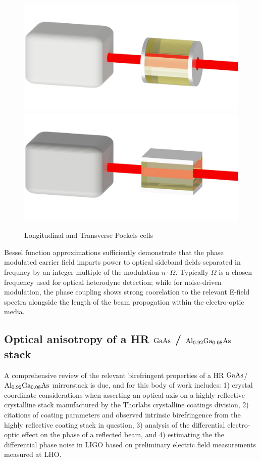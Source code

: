 \begin{figure}[!ht]
\begin{center}
	\begin{subcaptiongroup}
	     \includegraphics[width=.6\textwidth]{figs/ALGAAS/eom_l_assembly.pdf}
	     \label{pc_longitudinal}
	     \\
	     \includegraphics[width=.6\textwidth]{figs/ALGAAS/eom_t_assembly.pdf}
	     \label{pc_transverse}
	\end{subcaptiongroup}
\end{center}
    \caption{Longitudinal and Transverse Pockels cells}
    \label{fig:lpc_and_tpc}
\end{figure} 


Bessel function approximations sufficiently demonstrate that the phase modulated carrier field imparts power to optical sideband fields separated in frequncy by an integer multiple of the modulation $n \cdot \Omega$. Typically $\Omega$ is a chosen frequency used for optical heterodyne detection; while for noise-driven modulation, the phase coupling shows strong coorelation to the relevant E-field spectra alongside the length of the beam propogation within the electro-optic media.

\subsection{Optical anisotropy of a HR $\mathrm{GaAs}$ / $\mathrm{Al_{0.92}Ga_{0.08}As}$ stack}
A comprehensive review of the relevant birefringent properties of a HR $\mathrm{GaAs}$/$\mathrm{Al_{0.92}Ga_{0.08}As}$ mirrorstack is due, and for this body of work includes: 1) crystal coordinate considerations when asserting an optical axis on a highly reflective crystalline stack manufactured by the Thorlabs crystalline coatings division, 2) citations of coating parameters and observed intrinsic birefringence from the highly reflective coating stack in question, 3) analysis of the differential electro-optic effect on the phase of a reflected beam, and 4) estimating the the differential phase noise in LIGO based on preliminary electric field measurements measured at LHO.

